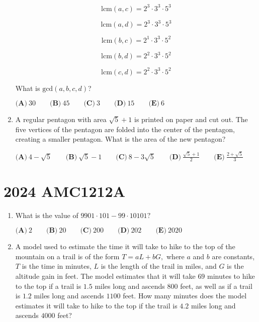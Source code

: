 \documentclass{article}
\begin{document}
\begin{enumerate}[label=\arabic*., itemsep=0.5em]
\begin{equation*}
\text{lcm}(a,c)=2^3\cdot 3^3\cdot 5^3
\end{equation*}


\begin{equation*}
\text{lcm}(a,d)=2^3\cdot 3^3\cdot 5^3
\end{equation*}


\begin{equation*}
\text{lcm}(b,c)=2^1\cdot 3^3\cdot 5^2
\end{equation*}


\begin{equation*}
\text{lcm}(b,d)=2^2\cdot 3^3\cdot 5^2
\end{equation*}


\begin{equation*}
\text{lcm}(c,d)=2^2\cdot 3^3\cdot 5^2
\end{equation*}


What is $\text{gcd}(a,b,c,d)$?

$\textbf{(A)}~30\qquad\textbf{(B)}~45\qquad\textbf{(C)}~3\qquad\textbf{(D)}~15\qquad\textbf{(E)}~6$\par \vspace{0.5em}\item A regular pentagon with area $\sqrt{5}+1$ is printed on paper and cut out. The five vertices of the pentagon are folded into the center of the pentagon, creating a smaller pentagon. What is the area of the new pentagon?

$\textbf{(A)}~4-\sqrt{5}\qquad\textbf{(B)}~\sqrt{5}-1\qquad\textbf{(C)}~8-3\sqrt{5}\qquad\textbf{(D)}~\frac{\sqrt{5}+1}{2}\qquad\textbf{(E)}~\frac{2+\sqrt{5}}{3}$\par \vspace{0.5em}\end{enumerate}\newpage\section*{2024 AMC1212A}\begin{enumerate}[label=\arabic*., itemsep=0.5em]\item What is the value of $9901\cdot101-99\cdot10101?$

$\textbf{(A)}~2\qquad\textbf{(B)}~20\qquad\textbf{(C)}~200\qquad\textbf{(D)}~202\qquad\textbf{(E)}~2020$\par \vspace{0.5em}\item A model used to estimate the time it will take to hike to the top of the mountain on a trail is of the form $T=aL+bG,$ where $a$ and $b$ are constants, $T$ is the time in minutes, $L$ is the length of the trail in miles, and $G$ is the altitude gain in feet. The model estimates that it will take $69$ minutes to hike to the top if a trail is $1.5$ miles long and ascends $800$ feet, as well as if a trail is $1.2$ miles long and ascends $1100$ feet. How many minutes does the model estimates it will take to hike to the top if the trail is $4.2$ miles long and ascends $4000$ feet?


\end{enumerate}
\end{document}
